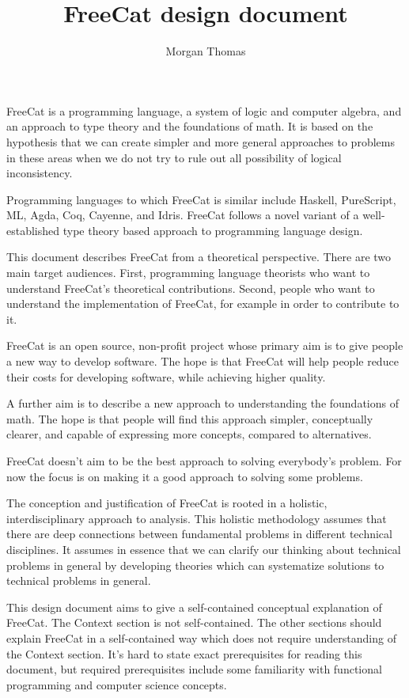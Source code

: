 \documentclass{article}
\title{FreeCat design document}
\author{Morgan Thomas}
\begin{document}
\maketitle

FreeCat is a programming language, a system of logic and computer algebra, and an approach to type theory and the foundations of math. It is based on the hypothesis that we can create simpler and more general approaches to problems in these areas when we do not try to rule out all possibility of logical inconsistency.

Programming languages to which FreeCat is similar include Haskell, PureScript, ML, Agda, Coq, Cayenne, and Idris. FreeCat follows a novel variant of a well-established type theory based approach to programming language design.

This document describes FreeCat from a theoretical perspective. There are two main target audiences. First, programming language theorists who want to understand FreeCat's theoretical contributions. Second, people who want to understand the implementation of FreeCat, for example in order to contribute to it.

FreeCat is an open source, non-profit project whose primary aim is to give people a new way to develop software. The hope is that FreeCat will help people reduce their costs for developing software, while achieving higher quality.

A further aim is to describe a new approach to understanding the foundations of math. The hope is that people will find this approach simpler, conceptually clearer, and capable of expressing more concepts, compared to alternatives.

FreeCat doesn't aim to be the best approach to solving everybody's problem. For now the focus is on making it a good approach to solving some problems.

The conception and justification of FreeCat is rooted in a holistic, interdisciplinary approach to analysis. This holistic methodology assumes that there are deep connections between fundamental problems in different technical disciplines. It assumes in essence that we can clarify our thinking about technical problems in general by developing theories which can systematize solutions to technical problems in general.

This design document aims to give a self-contained conceptual explanation of FreeCat. The Context section is not self-contained. The other sections should explain FreeCat in a self-contained way which does not require understanding of the Context section. It's hard to state exact prerequisites for reading this document, but required prerequisites include some familiarity with functional programming and computer science concepts.
\end{document}
